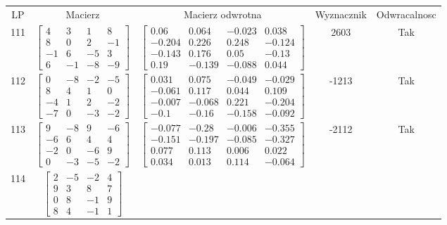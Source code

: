 \documentclass[a4paper,12pt]{article}
\begin{document}
\bgroup {} \vspace{0.2in} \begin{tabular}{c c c c c}
LP & Macierz & Macierz odwrotna & Wyznacznik & Odwracalnosc\\
111
&
$\begin{bmatrix} 4 & 3 & 1 & 8 \\ 8 & 0 & 2 & -1 \\ -1 & 6 & -5 & 3 \\ 6 & -1 & -8 & -9 \end{bmatrix}$
&
$\begin{bmatrix} 0.06 & 0.064 & -0.023 & 0.038 \\ -0.204 & 0.226 & 0.248 & -0.124 \\ -0.143 & 0.176 & 0.05 & -0.13 \\ 0.19 & -0.139 & -0.088 & 0.044 \end{bmatrix}$
&
2603
&
Tak
\\
112
&
$\begin{bmatrix} 0 & -8 & -2 & -5 \\ 8 & 4 & 1 & 0 \\ -4 & 1 & 2 & -2 \\ -7 & 0 & -3 & -2 \end{bmatrix}$
&
$\begin{bmatrix} 0.031 & 0.075 & -0.049 & -0.029 \\ -0.061 & 0.117 & 0.044 & 0.109 \\ -0.007 & -0.068 & 0.221 & -0.204 \\ -0.1 & -0.16 & -0.158 & -0.092 \end{bmatrix}$
&
-1213
&
Tak
\\
113
&
$\begin{bmatrix} 9 & -8 & 9 & -6 \\ -6 & 6 & 4 & 4 \\ -2 & 0 & -6 & 9 \\ 0 & -3 & -5 & -2 \end{bmatrix}$
&
$\begin{bmatrix} -0.077 & -0.28 & -0.006 & -0.355 \\ -0.151 & -0.197 & -0.085 & -0.327 \\ 0.077 & 0.113 & 0.006 & 0.022 \\ 0.034 & 0.013 & 0.114 & -0.064 \end{bmatrix}$
&
-2112
&
Tak
\\
114
&
$\begin{bmatrix} 2 & -5 & -2 & 4 \\ 9 & 3 & 8 & 7 \\ 0 & 8 & -1 & 9 \\ 8 & 4 & -1 & 1 \end{bmatrix}$

\end{tabular}
\end{document}
